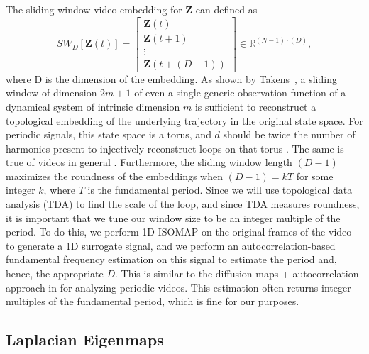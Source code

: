 \documentclass{article}
\newcommand{\mb}{\mathbf}
\begin{document}
The sliding window video embedding \cite{cao1998dynamics,traliehigh,tralie2017quasi} for $\mb{Z}$ can defined as
\begin{equation}
	SW_{D}[\mb{Z}(t)] = \left[ \begin{array}{c} \mb{Z}(t) \\ \mb{Z}(t + 1) \\ \vdots \\ \mb{Z}(t + (D-1))  \end{array} \right] \in \mathbb{R}^{(N-1)\cdot(D)},
\end{equation}
where D is the dimension of the embedding. As shown by Takens~\cite{takens1981detecting}, a sliding window of dimension $2m+1$ of even a single generic observation function of a dynamical system of intrinsic dimension $m$ is sufficient to reconstruct a topological embedding of the underlying trajectory in the original state space.  For periodic signals, this state space is a torus, and $d$ should be twice the number of harmonics present to injectively reconstruct loops on that torus \cite{perea2015sliding}.  The same is true of videos in general \cite{tralie2017quasi}.  Furthermore, the sliding window length $(D-1)$ maximizes the roundness of the embeddings when $(D-1) = k T$ for some integer $k$, where $T$ is the fundamental period.  Since we will use topological data analysis (TDA) to find the scale of the loop, and since TDA measures roundness, it is important that we tune our window size to be an integer multiple of the period.  To do this, we perform 1D ISOMAP \cite{tenenbaum2000global} on the original frames of the video to generate a 1D surrogate signal, and we perform an autocorrelation-based fundamental frequency estimation \cite{Mcleod05asmarter} on this signal to estimate the period and, hence, the appropriate $D$.  This is similar to the diffusion maps + autocorrelation approach in \cite{tralie2017quasi} for analyzing periodic videos.  This estimation often returns integer multiples of the fundamental period, which is fine for our purposes.

\subsection{Laplacian Eigenmaps}
\label{sec:laplacian}
\end{document}
